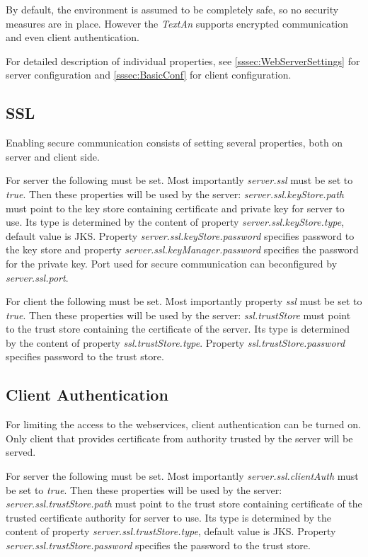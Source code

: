 \documentclass[12pt,a4paper]{report}
\newcommand{\textan}{\emph{TextAn}}
\begin{document}
By default, the environment is assumed to be completely safe, so no security
measures are in place. However the \textan{} supports encrypted communication
and even client authentication.

For detailed description of individual properties, see
\ref{sssec:WebServerSettings} for server configuration and
\ref{sssec:BasicConf} for client configuration.

\subsection{SSL}

Enabling secure communication consists of setting several properties, both
on server and client side.

For server the following must be set. Most importantly \emph{server.ssl} must
be set to \emph{true}. Then these properties will be used by the server:
\emph{server.ssl.keyStore.path} must point to the key store containing
certificate and private key for server to use. Its type is determined by
the content of property \emph{server.ssl.keyStore.type}, default value is JKS.
Property \emph{server.ssl.keyStore.password} specifies password to the key
store and property \emph{server.ssl.keyManager.password} specifies the password
for the private key. Port used for secure communication can beconfigured by
\emph{server.ssl.port}.

For client the following must be set. Most importantly property \emph{ssl} must
be set to \emph{true}. Then these properties will be used by the server:
\emph{ssl.trustStore} must point to the trust store containing the certificate
of the server. Its type is determined by the content of property
\emph{ssl.trustStore.type}. Property \emph{ssl.trustStore.password} specifies password to the trust store.

\subsection{Client Authentication}

For limiting the access to the webservices, client authentication can be turned
on. Only client that provides certificate from authority trusted by the server
will be served.

For server the following must be set. Most importantly
\emph{server.ssl.clientAuth} must be set to \emph{true}. Then these properties
will be used by the server: \emph{server.ssl.trustStore.path} must point to the
trust store containing certificate of the trusted certificate authority for
server to use. Its type is determined by the content of property
\emph{server.ssl.trustStore.type}, default value is JKS. Property
\emph{server.ssl.trustStore.password} specifies the password to the trust
store.
\end{document}
